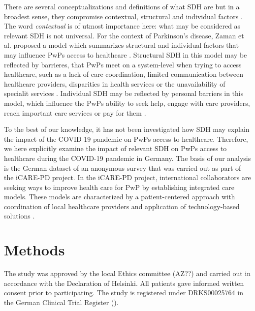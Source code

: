 \documentclass{bmcart}
\begin{document}
	There are several conceptualizations and definitions of what SDH are but in a broadest sense, they compromise contextual, structural and individual factors \cite{world2010conceptual}. The word \textit{contextual} is of utmost importance here: what may be considered as relevant SDH is not universal. For the context of Parkinson's disease, Zaman  et al. proposed a model which summarizes structural and individual factors that may influence PwPs access to healthcare \cite{zaman2021barriers}. 
	Structural SDH in this model may be reflected by barrieres, that PwPs meet on a system-level when trying to access healthcare, such as a lack of care coordination, limited communication between healthcare providers, disparities in health services or the unavailability of specialit services \cite{zaman2021barriers}. Individual SDH may be reflected by personal barriers in this model, which influence the PwPs ability to seek help, engage with care providers, reach important care services or pay for them \cite{zaman2021barriers}. 
	
	To the best of our knowledge, it has not been investigated how SDH may explain the impact of the COVID-19 pandemic on PwPs access to healthcare. Therefore, we here explicitly examine the impact of relevant SDH on PwPs access to healthcare during the COVID-19 pandemic in Germany. The basis of our analysis is the German dataset of an anonymous survey that was carried out as part of the iCARE-PD project. In the iCARE-PD project, international collaborators are seeking ways to improve health care for PwP by establishing integrated care models. These models are characterized by a patient-centered approach with coordination of local healthcare providers and application of technology-based solutions \cite{fabbri2020moving}.  
\fi
	

\section*{Methods}
The study was approved by the local Ethics committee (AZ??) and carried out in accordance with the Declaration of Helsinki. All patients gave informed written consent prior to participating. The study is registered under DRKS00025764 in the German Clinical Trial Register (\url{}). %
\end{document}
